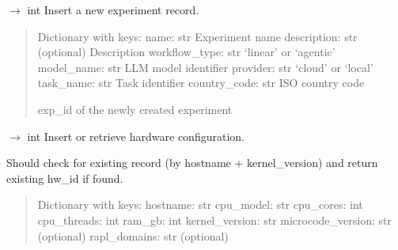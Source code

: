 \documentclass[letterpaper,10pt,english]{sphinxmanual}
\begin{document}
\begin{fulllineitems}
\begin{fulllineitems}
\label{\detokenize{core.database.base:core.database.base.DatabaseInterface.insert_experiment}}
\pysigstartsignatures
\pysiglinewithargsret
{}
{}
{{ $\rightarrow$ int}}
\pysigstopsignatures
\sphinxAtStartPar
Insert a new experiment record.
\begin{quote}\begin{description}
\sphinxAtStartPar
{} \textendash{} Dictionary with keys:
\sphinxhyphen{} name: str \sphinxhyphen{} Experiment name
\sphinxhyphen{} description: str (optional) \sphinxhyphen{} Description
\sphinxhyphen{} workflow\_type: str \sphinxhyphen{} ‘linear’ or ‘agentic’
\sphinxhyphen{} model\_name: str \sphinxhyphen{} LLM model identifier
\sphinxhyphen{} provider: str \sphinxhyphen{} ‘cloud’ or ‘local’
\sphinxhyphen{} task\_name: str \sphinxhyphen{} Task identifier
\sphinxhyphen{} country\_code: str \sphinxhyphen{} ISO country code

\sphinxAtStartPar
exp\_id of the newly created experiment

\end{description}\end{quote}

\end{fulllineitems}


\begin{fulllineitems}
\label{\detokenize{core.database.base:core.database.base.DatabaseInterface.insert_hardware}}
\pysigstartsignatures
\pysiglinewithargsret
{}
{}
{{ $\rightarrow$ int}}
\pysigstopsignatures
\sphinxAtStartPar
Insert or retrieve hardware configuration.

\sphinxAtStartPar
Should check for existing record (by hostname + kernel\_version)
and return existing hw\_id if found.
\begin{quote}\begin{description}
\sphinxAtStartPar
{} \textendash{} Dictionary with keys:
\sphinxhyphen{} hostname: str
\sphinxhyphen{} cpu\_model: str
\sphinxhyphen{} cpu\_cores: int
\sphinxhyphen{} cpu\_threads: int
\sphinxhyphen{} ram\_gb: int
\sphinxhyphen{} kernel\_version: str
\sphinxhyphen{} microcode\_version: str (optional)
\sphinxhyphen{} rapl\_domains: str (optional)


\end{description}
\end{quote}
\end{fulllineitems}
\end{fulllineitems}
\end{document}
